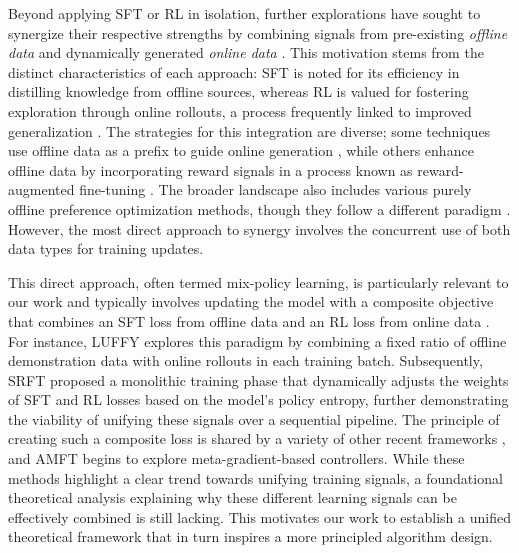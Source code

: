 Beyond applying SFT or RL in isolation, further explorations have sought to synergize their respective strengths by combining signals from pre-existing \textit{offline data} and dynamically generated \textit{online data} \citep{fu2025srft, yan2025learning}. This motivation stems from the distinct characteristics of each approach: SFT is noted for its efficiency in distilling knowledge from offline sources, whereas RL is valued for fostering exploration through online rollouts, a process frequently linked to improved generalization \citep{rajani2025scalpel, chu2025sftmemorizesrlgeneralizes}. The strategies for this integration are diverse; some techniques use offline data as a prefix to guide online generation \citep{zhou2023prefix, touvron2024context, li2025self_guided, wang2025beyond}, while others enhance offline data by incorporating reward signals in a process known as reward-augmented fine-tuning \citep{liu2024dft, zhao2023reward, park2025reward_reweighted, sun2025ktae}. The broader landscape also includes various purely offline preference optimization methods, though they follow a different paradigm \citep{rafailov2023dpo, mitchell2024leveraging, liu2025principled, ethayarajh2024kto, ahmadian2024back}. However, the most direct approach to synergy involves the concurrent use of both data types for training updates.


This direct approach, often termed mix-policy learning, is particularly relevant to our work and typically involves updating the model with a composite objective that combines an SFT loss from offline data and an RL loss from online data \citep{dong2023raft, gulcehre2023reinforced, singh2023beyond, liu2023bridging}. For instance, LUFFY \citep{yan2025learning} explores this paradigm by combining a fixed ratio of offline demonstration data with online rollouts in each training batch. Subsequently, SRFT \citep{fu2025srft} proposed a monolithic training phase that dynamically adjusts the weights of SFT and RL losses based on the model's policy entropy, further demonstrating the viability of unifying these signals over a sequential pipeline. The principle of creating such a composite loss is shared by a variety of other recent frameworks \citep{wu2024alternating, zhang2025on, kim2025dynamic, yu2025dapo, 2025empoweringsmallvlmsthink}, and AMFT \citep{2025aligningllm} begins to explore meta-gradient-based controllers. While these methods highlight a clear trend towards unifying training signals, a foundational theoretical analysis explaining why these different learning signals can be effectively combined is still lacking. This motivates our work to establish a unified theoretical framework that in turn inspires a more principled algorithm design.

